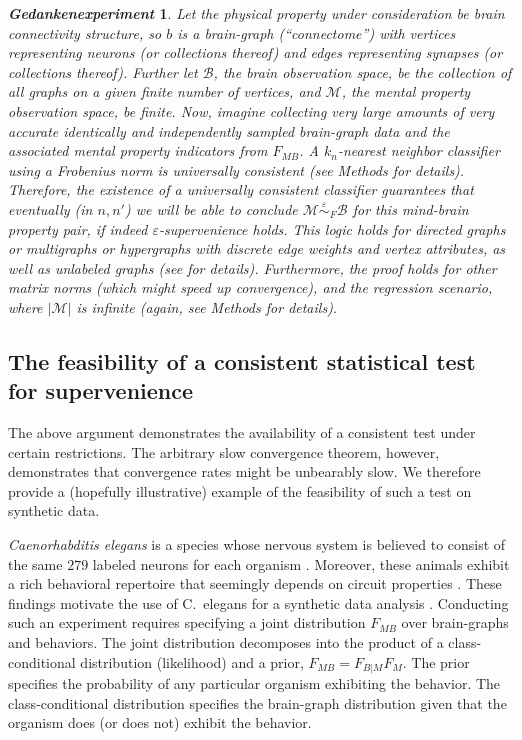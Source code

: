 \documentclass{article}
\newcommand{\mB}{\mathcal{B}}
\newcommand{\mM}{\mathcal{M}}
\providecommand{\mc}[1]{\mathcal{#1}}
\newcommand{\MeB}{\mM \overset{\varepsilon}{{\sim}}_{F} \mB}
\newtheorem{thex}{\emph{Gedankenexperiment}}
\begin{document}

\begin{thex}
Let the physical property under consideration be brain connectivity structure, so $b$ is a brain-graph (``connectome'') with vertices representing neurons (or collections thereof) and edges representing synapses (or collections thereof). Further let $\mB$, the brain observation space, be the collection of all graphs on a given finite number of vertices, and $\mc{M}$, the mental property observation space, be finite. Now, imagine collecting very large amounts of very accurate identically and independently sampled  brain-graph data and the associated mental property indicators from $F_{MB}$. A $k_n$-nearest neighbor classifier using a Frobenius norm is universally consistent (see Methods for details). Therefore, %
the existence of a universally consistent classifier guarantees that eventually (in $n,n'$) we will be able to conclude $\MeB$ for this mind-brain property pair, if indeed $\varepsilon$-supervenience holds. This logic holds for directed graphs or multigraphs or hypergraphs with discrete edge weights and vertex attributes, as well as unlabeled graphs (see \cite{VP11unlabeled} for details). Furthermore, the proof holds for other matrix norms (which might speed up convergence), and the regression scenario, where $|\mM|$ is infinite (again, see Methods for details).  
\end{thex}


\subsection*{The feasibility of a consistent statistical test for supervenience} %


The above argument demonstrates the availability of a consistent test under certain restrictions.  The arbitrary slow convergence theorem, however, demonstrates that convergence rates might be unbearably slow.  We therefore provide a (hopefully illustrative) example of the feasibility of such a test on synthetic data.

{\it Caenorhabditis elegans} is a species whose nervous system is believed to consist of the same $279$ labeled neurons for each organism \cite{Durbin87}. Moreover, these animals exhibit a rich behavioral repertoire that seemingly depends on circuit properties \cite{deBonoMaricq05}.  These findings motivate the use of C.~elegans for a synthetic data analysis \cite{Tukey}.  Conducting such an experiment requires specifying a joint distribution $F_{MB}$ over brain-graphs and behaviors.  The joint distribution decomposes into the product of a class-conditional distribution (likelihood) and a prior, $F_{MB}=F_{B|M}F_M$. The prior  specifies the probability of any particular organism exhibiting the behavior.  The class-conditional distribution specifies the brain-graph distribution given that the organism does (or does not) exhibit the behavior. 
\end{document}
